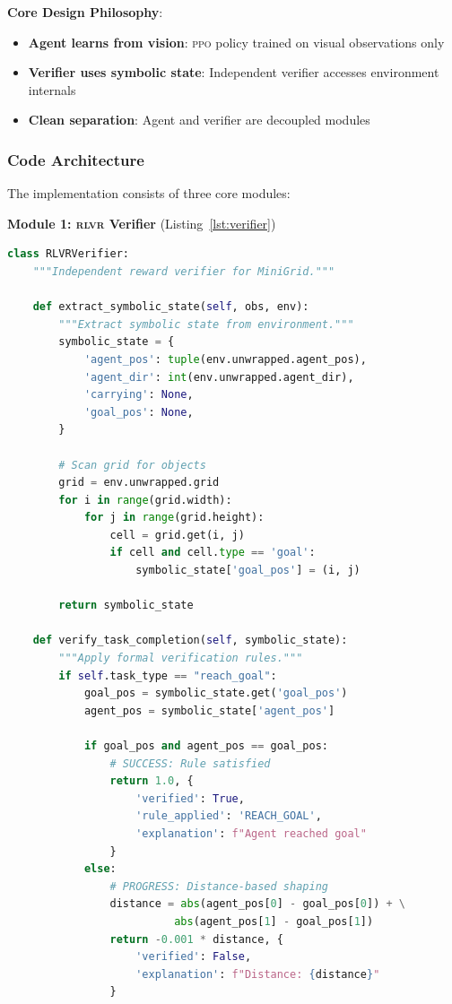 \documentclass[11pt,a4paper]{article}
\newcommand{\rlvr}{\textsc{rlvr}}
\newcommand{\ppo}{\textsc{ppo}}
\begin{document}
\textbf{Core Design Philosophy}:
\begin{itemize}[leftmargin=*]
    \item \textbf{Agent learns from vision}: \ppo{} policy trained on visual observations only
    \item \textbf{Verifier uses symbolic state}: Independent verifier accesses environment internals
    \item \textbf{Clean separation}: Agent and verifier are decoupled modules
\end{itemize}

\subsubsection{Code Architecture}

The implementation consists of three core modules:

\textbf{Module 1: \rlvr{} Verifier} (Listing~\ref{lst:verifier})

\begin{lstlisting}[caption={Core verification logic from \texttt{rlvr\_verifier.py}}, label=lst:verifier, language=Python]
class RLVRVerifier:
    """Independent reward verifier for MiniGrid."""
    
    def extract_symbolic_state(self, obs, env):
        """Extract symbolic state from environment."""
        symbolic_state = {
            'agent_pos': tuple(env.unwrapped.agent_pos),
            'agent_dir': int(env.unwrapped.agent_dir),
            'carrying': None,
            'goal_pos': None,
        }
        
        # Scan grid for objects
        grid = env.unwrapped.grid
        for i in range(grid.width):
            for j in range(grid.height):
                cell = grid.get(i, j)
                if cell and cell.type == 'goal':
                    symbolic_state['goal_pos'] = (i, j)
        
        return symbolic_state
    
    def verify_task_completion(self, symbolic_state):
        """Apply formal verification rules."""
        if self.task_type == "reach_goal":
            goal_pos = symbolic_state.get('goal_pos')
            agent_pos = symbolic_state['agent_pos']
            
            if goal_pos and agent_pos == goal_pos:
                # SUCCESS: Rule satisfied
                return 1.0, {
                    'verified': True,
                    'rule_applied': 'REACH_GOAL',
                    'explanation': f"Agent reached goal"
                }
            else:
                # PROGRESS: Distance-based shaping
                distance = abs(agent_pos[0] - goal_pos[0]) + \
                          abs(agent_pos[1] - goal_pos[1])
                return -0.001 * distance, {
                    'verified': False,
                    'explanation': f"Distance: {distance}"
                }
\end{lstlisting}
\end{document}
